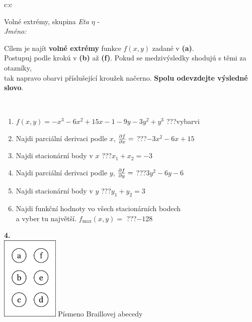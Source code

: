 \documentclass[10pt]{report}
\begin{document}
\begin{tabular}{c:c}
\begin{minipage}[c][104.5mm][t]{0.5\linewidth}
\begin{center}
\vspace{7mm}
{\huge Volné extrémy, skupina \textit{Eta $\eta$} -}\\[5mm]
\textit{Jméno:}\phantom{xxxxxxxxxxxxxxxxxxxxxxxxxxxxxxxxxxxxxxxxxxxxxxxxxxxxxxxxxxxxxxxxx}\\[5mm]
\begin{minipage}{0.95\linewidth}
\begin{center}
Cílem je najít \textbf{volné extrémy} funkce $f(x,y)$ zadané v \textbf{(a)}.\\Postupuj podle krokú v \textbf{(b)} až \textbf{(f)}. Pokud se medzivýsledky shodujú s těmi za otazníky,\\tak napravo obarvi příslušející kroužek načerno. \textbf{Spolu odevzdejte výsledné slovo}.
\end{center}
\end{minipage}
\\[1mm]
\begin{minipage}{0.79\linewidth}
\begin{center}
\begin{varwidth}{\linewidth}
\begin{enumerate}
\normalsize
\item $f(x,y)=-x^3-6x^2+15x-1-9y-3y^2+y^3$\quad \dotfill\; ???\;\dotfill \quad vybarvi
\item Najdi parciální derivaci podle $x$, $\pdv{f}{x}=$\quad \dotfill\; ???\;\dotfill \quad $-3x^2-6x+15$
\item Najdi stacionární body v $x$\quad \dotfill\; ???\;\dotfill \quad $x_1+x_2=-3$
\item Najdi parciální derivaci podle $y$, $\pdv{f}{y}=$\quad \dotfill\; ???\;\dotfill \quad $3y^2-6y-6$
\item Najdi stacionární body v $y$\quad \dotfill\; ???\;\dotfill \quad $y_1+y_2=3$
\item Najdi funkční hodnoty vo všech stacionárních bodech \\ \phantom{xxxxxx} a vyber tu najvětší. $f_{\text{max}}(x,y)=$\quad \dotfill\; ???\;\dotfill \quad $-128$
\end{enumerate}
\end{varwidth}
\end{center}
\end{minipage}
\begin{minipage}{0.20\linewidth}
\begin{center}
{\Huge\bfseries 4.} \\[2mm]
\includegraphics[height=40mm]{../images/braille.png}
{\small Písmeno Braillovej abecedy}
\end{center}
\end{minipage}
\end{center}
\end{minipage}
%
\end{tabular}
\end{document}
